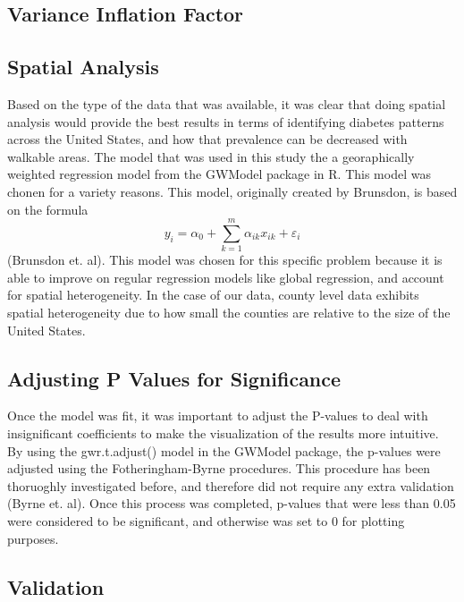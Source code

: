 \documentclass[
]{article}
\begin{document}
\subsection{Variance Inflation Factor}\label{variance-inflation-factor}

\subsection{Spatial Analysis}\label{spatial-analysis}

Based on the type of the data that was available, it was clear that
doing spatial analysis would provide the best results in terms of
identifying diabetes patterns across the United States, and how that
prevalence can be decreased with walkable areas. The model that was used
in this study the a georaphically weighted regression model from the
GWModel package in R. This model was chonen for a variety reasons. This
model, originally created by Brunsdon, is based on the formula
\[y_i = \alpha_{0} + \sum_{k=1}^{m} \alpha_{ik}x_{ik} + \varepsilon_{i}\]
(Brunsdon et. al). This model was chosen for this specific problem
because it is able to improve on regular regression models like global
regression, and account for spatial heterogeneity. In the case of our
data, county level data exhibits spatial heterogeneity due to how small
the counties are relative to the size of the United States.

\subsection{Adjusting P Values for
Significance}\label{adjusting-p-values-for-significance}

Once the model was fit, it was important to adjust the P-values to deal
with insignificant coefficients to make the visualization of the results
more intuitive. By using the gwr.t.adjust() model in the GWModel
package, the p-values were adjusted using the Fotheringham-Byrne
procedures. This procedure has been thoruoghly investigated before, and
therefore did not require any extra validation (Byrne et. al). Once this
process was completed, p-values that were less than 0.05 were considered
to be significant, and otherwise was set to 0 for plotting purposes.

\subsection{Validation}\label{validation}
\end{document}
